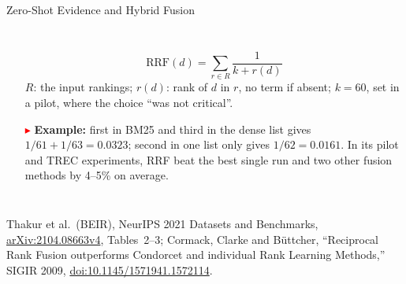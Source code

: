 \begin{frame}{Zero-Shot Evidence and Hybrid Fusion}
\begin{columns}[T,onlytextwidth]
\begin{itemize}
          \[ \text{RRF}(d) = \sum_{r \in R} \frac{1}{k + r(d)} \]
          $R$: the input rankings; $r(d)$: rank of $d$ in $r$, no term if absent; $k = 60$, set in a pilot, where the choice ``was not critical''.
        \item[\textcolor{red}{$\blacktriangleright$}] \textbf{Example:} first in BM25 and third in the dense list gives $1/61 + 1/63 = 0.0323$; second in one list only gives $1/62 = 0.0161$. In its pilot and TREC experiments, RRF beat the best single run and two other fusion methods by 4--5\% on average.
      \end{itemize}
  \end{columns}
  \vspace{0.1em}
  {\scriptsize Thakur et al.\ (BEIR), NeurIPS 2021 Datasets and Benchmarks, \href{https://arxiv.org/abs/2104.08663v4}{arXiv:2104.08663v4}, Tables~2--3; Cormack, Clarke and B\"uttcher, ``Reciprocal Rank Fusion outperforms Condorcet and individual Rank Learning Methods,'' SIGIR 2009, \href{https://doi.org/10.1145/1571941.1572114}{doi:10.1145/1571941.1572114}.\par}
\end{frame}

